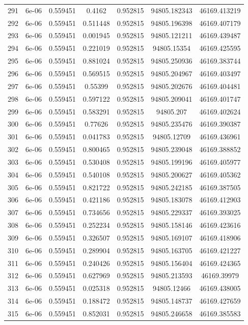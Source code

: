 \begin{table}
\begin{tabular*}{\linewidth}{c|c|c|c|c|c|c}
291 & 6e-06 & 0.559451 & 0.4162 & 0.952815 & 94805.182343 & 46169.413219\\
292 & 6e-06 & 0.559451 & 0.511448 & 0.952815 & 94805.196398 & 46169.407179\\
293 & 6e-06 & 0.559451 & 0.001945 & 0.952815 & 94805.121211 & 46169.439487\\
294 & 6e-06 & 0.559451 & 0.221019 & 0.952815 & 94805.15354 & 46169.425595\\
295 & 6e-06 & 0.559451 & 0.881024 & 0.952815 & 94805.250936 & 46169.383744\\
296 & 6e-06 & 0.559451 & 0.569515 & 0.952815 & 94805.204967 & 46169.403497\\
297 & 6e-06 & 0.559451 & 0.55399 & 0.952815 & 94805.202676 & 46169.404481\\
298 & 6e-06 & 0.559451 & 0.597122 & 0.952815 & 94805.209041 & 46169.401747\\
299 & 6e-06 & 0.559451 & 0.583291 & 0.952815 & 94805.207 & 46169.402624\\
300 & 6e-06 & 0.559451 & 0.77626 & 0.952815 & 94805.235476 & 46169.390387\\
301 & 6e-06 & 0.559451 & 0.041783 & 0.952815 & 94805.12709 & 46169.436961\\
302 & 6e-06 & 0.559451 & 0.800465 & 0.952815 & 94805.239048 & 46169.388852\\
303 & 6e-06 & 0.559451 & 0.530408 & 0.952815 & 94805.199196 & 46169.405977\\
304 & 6e-06 & 0.559451 & 0.540108 & 0.952815 & 94805.200627 & 46169.405362\\
305 & 6e-06 & 0.559451 & 0.821722 & 0.952815 & 94805.242185 & 46169.387505\\
306 & 6e-06 & 0.559451 & 0.421186 & 0.952815 & 94805.183078 & 46169.412903\\
307 & 6e-06 & 0.559451 & 0.734656 & 0.952815 & 94805.229337 & 46169.393025\\
308 & 6e-06 & 0.559451 & 0.252234 & 0.952815 & 94805.158146 & 46169.423616\\
309 & 6e-06 & 0.559451 & 0.326507 & 0.952815 & 94805.169107 & 46169.418906\\
310 & 6e-06 & 0.559451 & 0.289904 & 0.952815 & 94805.163705 & 46169.421227\\
311 & 6e-06 & 0.559451 & 0.240426 & 0.952815 & 94805.156404 & 46169.424365\\
312 & 6e-06 & 0.559451 & 0.627969 & 0.952815 & 94805.213593 & 46169.39979\\
313 & 6e-06 & 0.559451 & 0.025318 & 0.952815 & 94805.12466 & 46169.438005\\
314 & 6e-06 & 0.559451 & 0.188472 & 0.952815 & 94805.148737 & 46169.427659\\
315 & 6e-06 & 0.559451 & 0.852031 & 0.952815 & 94805.246658 & 46169.385583\\
\end{tabular*}
\end{table}
